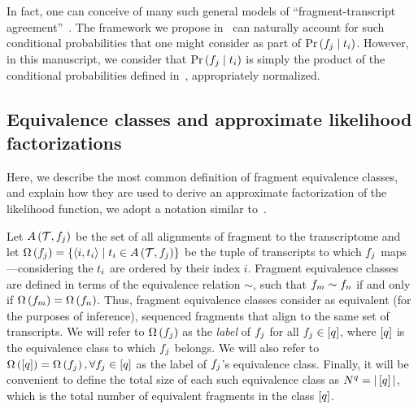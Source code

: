 In fact, one can conceive of many such general models of ``fragment-transcript
agreement''~\citep{Patro2017Salmon}. The framework we propose
in~ can naturally account for such conditional probabilities 
that one might consider as part of $\Prob{f_j}{t_i}$.  However, in this manuscript,
we consider that $\Prob{f_j}{t_i}$ is simply the product of the conditional 
probabilities defined in~, 
appropriately normalized.

\subsection{Equivalence classes and approximate likelihood factorizations}
\label{subsec:eq_classes}

Here, we describe the most common definition of fragment equivalence classes,
and explain how they are used to derive an approximate factorization of the
likelihood function, we adopt a notation similar to~\citet{Patro2017Salmon}.

Let $A\left(\mathcal{T}, f_{j}\right)$ be the set of all alignments of fragment
 to the transcriptome \txps and let $\Omega\left(f_{j}\right) = \{ \langle i,
t_{i} \rangle \mid t_{i} \in A\left(\mathcal{T}, f_{j}\right) \}$ be the tuple
of transcripts to which $f_{j}$ maps---considering the $t_{i}$ are ordered
by their index $i$. Fragment equivalence classes are defined in terms of the
equivalence relation $\sim$, such that $f_{m} \sim f_{n}$ if and only if
$\Omega\left(f_{m}\right) = \Omega\left(f_{n}\right)$. Thus, fragment equivalence classes
consider as equivalent (for the purposes of inference), sequenced fragments that
align to the same set of transcripts. We will refer to $\Omega\left(f_{j}\right)$
as the \emph{label} of $f_{j}$ for all $f_{j} \in \left[q\right]$, where
$\left[q\right]$ is the equivalence class to which $f_{j}$ belongs. We will also
refer to $\Omega\left(\left[q\right]\right) = \Omega\left(f_{j}\right), \forall f_{j} \in
\left[q\right]$ as the label of $f_{j}$'s equivalence class. Finally, it will be
convenient to define the total size of each such equivalence class as
$N^{q} = |\left[q\right]|$, which is the total number of equivalent fragments
in the class $\left[q\right]$.

